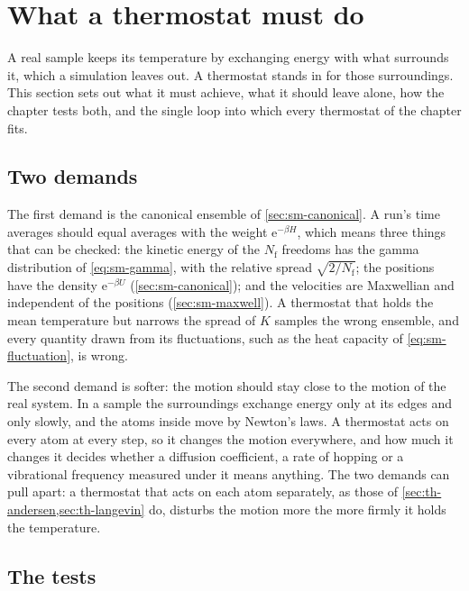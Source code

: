 \section{What a thermostat must do}
\label{sec:th-tests}

A real sample keeps its temperature by exchanging energy with what
surrounds it, which a simulation leaves out. A thermostat stands in for
those surroundings. This section sets out what it must achieve, what it
should leave alone, how the chapter tests both, and the single loop into
which every thermostat of the chapter fits.

\subsection*{Two demands}

The first demand is the canonical ensemble of \cref{sec:sm-canonical}. A
run's time averages should equal averages with the weight
$\mathrm{e}^{-\beta H}$, which means three things that can be checked:
the kinetic energy of the $N_{\mathrm f}$ freedoms has the gamma
distribution of \cref{eq:sm-gamma}, with the relative spread
$\sqrt{2/N_{\mathrm f}}$; the positions have the density
$\mathrm{e}^{-\beta U}$ (\cref{sec:sm-canonical}); and the velocities are
Maxwellian and independent of the positions (\cref{sec:sm-maxwell}).
A thermostat that holds the mean temperature but narrows the spread of $K$
samples the wrong ensemble, and every quantity drawn from its
fluctuations, such as the heat capacity of \cref{eq:sm-fluctuation}, is
wrong.

The second demand is softer: the motion should stay close to the motion
of the real system. In a sample the surroundings exchange energy only at
its edges and only slowly, and the atoms inside move by Newton's laws. A
thermostat acts on every atom at every step, so it changes the motion
everywhere, and how much it changes it decides whether a diffusion
coefficient, a rate of hopping or a vibrational frequency measured under
it means anything. The two demands can pull apart: a thermostat that
acts on each atom separately, as those of \cref{sec:th-andersen,sec:th-langevin}
do, disturbs the motion more the more firmly it holds the temperature.

\subsection*{The tests}

